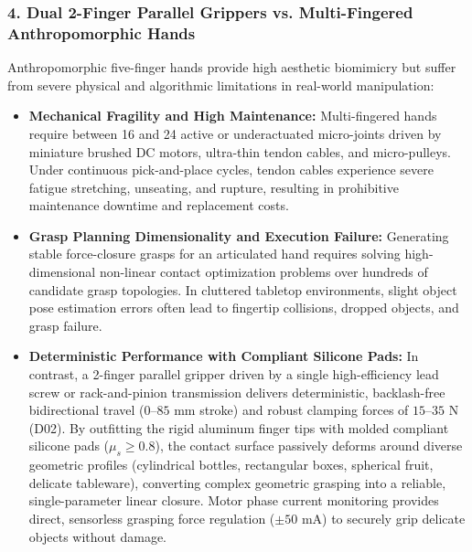 \subsubsection{4. Dual 2-Finger Parallel Grippers vs. Multi-Fingered Anthropomorphic Hands}
Anthropomorphic five-finger hands provide high aesthetic biomimicry but suffer from severe physical and algorithmic limitations in real-world manipulation:
\begin{itemize}[leftmargin=1.5em]
  \item \textbf{Mechanical Fragility and High Maintenance:} Multi-fingered hands require between 16 and 24 active or underactuated micro-joints driven by miniature brushed DC motors, ultra-thin tendon cables, and micro-pulleys. Under continuous pick-and-place cycles, tendon cables experience severe fatigue stretching, unseating, and rupture, resulting in prohibitive maintenance downtime and replacement costs.
  \item \textbf{Grasp Planning Dimensionality and Execution Failure:} Generating stable force-closure grasps for an articulated hand requires solving high-dimensional non-linear contact optimization problems over hundreds of candidate grasp topologies. In cluttered tabletop environments, slight object pose estimation errors often lead to fingertip collisions, dropped objects, and grasp failure.
  \item \textbf{Deterministic Performance with Compliant Silicone Pads:} In contrast, a 2-finger parallel gripper driven by a single high-efficiency lead screw or rack-and-pinion transmission delivers deterministic, backlash-free bidirectional travel ($0\text{--}85\text{ mm}$ stroke) and robust clamping forces of $15\text{--}35\text{ N}$ (D02). By outfitting the rigid aluminum finger tips with molded compliant silicone pads ($\mu_s \ge 0.8$), the contact surface passively deforms around diverse geometric profiles (cylindrical bottles, rectangular boxes, spherical fruit, delicate tableware), converting complex geometric grasping into a reliable, single-parameter linear closure. Motor phase current monitoring provides direct, sensorless grasping force regulation ($\pm 50\text{ mA}$) to securely grip delicate objects without damage.
\end{itemize}

